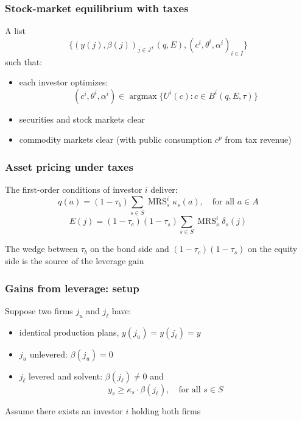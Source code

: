 \documentclass[blue]{beamer}
\def\geq{\geqslant}
\DeclareMathOperator\argmax{argmax}
\DeclareMathOperator\MRS{MRS}
\theoremstyle{definition}
\theoremstyle{example}
\begin{document}
\begin{frame}\frametitle{Stock-market equilibrium with taxes}
A list
\begin{equation*}
\bigl\{ (y(j), \beta(j))_{j \in J}, (q, E), (c^i, \theta^i, \alpha^i)_{i \in I} \bigr\}
\end{equation*}
such that:
\begin{itemize}
\item[(a)] each investor optimizes:
\begin{equation*}
(c^i, \theta^i, \alpha^i) \in \argmax \{ U^i(c) \colon c \in B^i(q, E, \tau) \}
\end{equation*}
\item[(b)] securities and stock markets clear
\item[(c)] commodity markets clear (with public consumption $c^p$ from tax revenue)
\end{itemize}
\end{frame}

\begin{frame}\frametitle{Asset pricing under taxes}
The first-order conditions of investor $i$ deliver:
\begin{equation*}
q(a) = (1-\tau_b) \sum_{s \in S} \MRS^i_s \kappa_s(a), \quad \text{for all $a \in A$}
\end{equation*}
\begin{equation*}
E(j) = (1-\tau_c)(1-\tau_s) \sum_{s \in S} \MRS^i_s \delta_s(j)
\end{equation*}
\bigskip

The wedge between $\tau_b$ on the bond side and $(1-\tau_c)(1-\tau_s)$ on the equity side is the source of the leverage gain
\end{frame}

\begin{frame}\frametitle{Gains from leverage: setup}
Suppose two firms $j_u$ and $j_\ell$ have:
\begin{itemize}
\item identical production plans, $y(j_u) = y(j_\ell) = y$
\item $j_u$ unlevered: $\beta(j_u) = 0$
\item $j_\ell$ levered and solvent: $\beta(j_\ell) \neq 0$ and
\begin{equation*}
y_s \geq \kappa_s \cdot \beta(j_\ell), \quad \text{for all $s \in S$}
\end{equation*}
\end{itemize}
\bigskip

Assume there exists an investor $i$ holding both firms
\end{frame}
\end{document}
